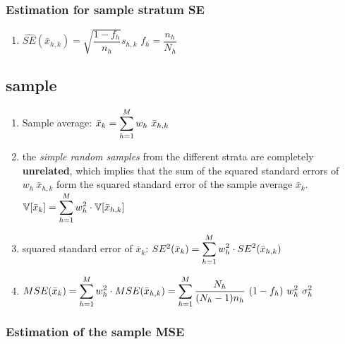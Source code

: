 \subsubsection{Estimation for sample stratum SE}
\begin{enumerate}
    \item $
        \hat{SE}(\bar{x}_{h,k})
        = \sqrt{\dfrac{1 - f_h}{n_h}} s_{h,k}
    $
    \hfill
    $f_h = \dfrac{n_h}{N_h}$
    \hfill \cite{statistics/book/Statistics-for-Data-Scientists/Maurits-Kaptein}
\end{enumerate}



\subsection{sample}
\begin{enumerate}
    \item Sample average: $
        \bar{x}_k = \displaystyle\sum^M_{h=1} w_h\ \bar{x}_{h,k}
    $
    \hfill \cite{statistics/book/Statistics-for-Data-Scientists/Maurits-Kaptein}

    \item the \textit{simple random samples} from the different strata are completely \textbf{unrelated}, which implies that the sum of the squared standard errors of $w_h \ \bar{x}_{h,k}$ form the squared standard error of the sample average $\bar{x}_k$.
    \hfill \cite{statistics/book/Statistics-for-Data-Scientists/Maurits-Kaptein}
    \\
    $
        \mathbb{V}[\bar{x}_k] = \displaystyle\sum_{h=1}^M w_h^2 \cdot \mathbb{V}[\bar{x}_{h,k}]
    $
    \hfill \cite{common/online/chatgpt}


    \item squared standard error of $\bar{x}_k$:
    $
        SE^2(\bar{x}_k) = \displaystyle\sum_{h=1}^M w_h^2 \cdot SE^2(\bar{x}_{h,k})
    $
    \hfill \cite{common/online/chatgpt}

    \item $
        MSE(\bar{x}_k )
        = \dsum^M_{h=1} w^2_h \cdot MSE(\bar{x}_{h,k} )
        = \dsum^M_{h=1} \dfrac{N_h}{(N_h - 1)n_h} \ (1 - f_h)\ w^2_h\ \sigma^2_h$
    \hfill \cite{statistics/book/Statistics-for-Data-Scientists/Maurits-Kaptein}

\end{enumerate}


\subsubsection{Estimation of the sample MSE}


